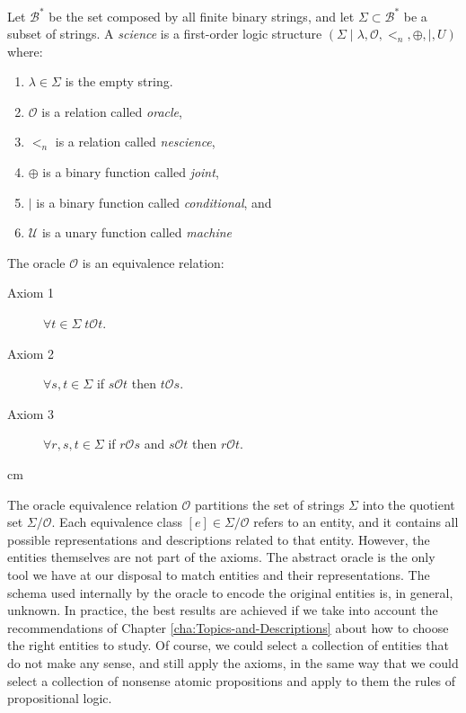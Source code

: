 Let $\mathcal{B}^\ast$ be the set composed by all finite binary strings, and let $\Sigma \subset \mathcal{B}^\ast$ be a subset of strings. A \emph{science} is a first-order logic structure $(\Sigma \mid \lambda, \mathcal{O}, <_n, \oplus, \mid, U)$ where:

\vskip 0.25cm

\begin{enumerate}[label=(\roman*)]
\item $\lambda \in \Sigma$ is the empty string.
\item $\mathcal{O}$ is a relation called \emph{oracle},
\item $<_n$ is a relation called \emph{nescience},
\item $\oplus$ is a binary function called \emph{joint},
\item $\mid$ is a binary function called \emph{conditional}, and
\item $\mathcal{U}$ is a unary function called \emph{machine}
\end{enumerate}

\vskip 0.25cm

The oracle $\mathcal{O}$ is an equivalence relation:

\vskip 0.25cm

\begin{description}
\item[Axiom 1] $\forall t \in \Sigma \; t \mathcal{O} t$.
\item[Axiom 2] $\forall s , t \in \Sigma$ if $s \mathcal{O} t$ then $t \mathcal{O} s$.
\item[Axiom 3] $\forall r, s , t \in \Sigma$ if $r \mathcal{O} s$ and $s \mathcal{O} t$ then $r \mathcal{O} t$.
\end{description}

 cm

The oracle equivalence relation $\mathcal{O}$ partitions the set of strings $\Sigma$ into the quotient set $\Sigma / \mathcal{O}$. Each equivalence class $[e] \in \Sigma / \mathcal{O}$ refers to an entity, and it contains all possible representations and descriptions related to that entity. However, the entities themselves are not part of the axioms. The abstract oracle is the only tool we have at our disposal to match entities and their representations. The schema used internally by the oracle to encode the original entities is, in general, unknown. In practice, the best results are achieved if we take into account the recommendations of Chapter \ref{cha:Topics-and-Descriptions} about how to choose the right entities to study. Of course, we could select a collection of entities that do not make any sense, and still apply the axioms, in the same way that we could select a collection of nonsense atomic propositions and apply to them the rules of propositional logic.


